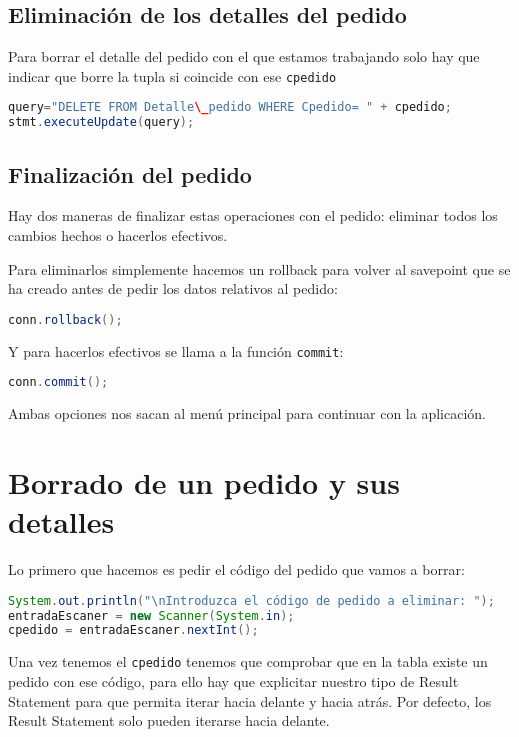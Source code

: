 \subsection{Eliminación de los detalles del pedido}

Para borrar el detalle del pedido con el que estamos trabajando solo hay que indicar que borre la tupla si coincide con ese \texttt{cpedido}

\begin{lstlisting}[language=Java]
query="DELETE FROM Detalle\_pedido WHERE Cpedido= " + cpedido;
stmt.executeUpdate(query);
\end{lstlisting}

\subsection{Finalización del pedido}

Hay dos maneras de finalizar estas operaciones con el pedido: eliminar todos los cambios hechos o hacerlos efectivos.

Para eliminarlos simplemente hacemos un rollback para volver al savepoint que se ha creado antes de pedir los datos relativos al pedido:
\begin{lstlisting}[language=Java]
conn.rollback();
\end{lstlisting}

Y para hacerlos efectivos se llama a la función \texttt{commit}:

\begin{lstlisting}[language=Java]
conn.commit();
\end{lstlisting}

Ambas opciones nos sacan al menú principal para continuar con la aplicación.

\section{Borrado de un pedido y sus detalles}

Lo primero que hacemos es pedir el código del pedido que vamos a borrar:

\begin{lstlisting}[language=Java]
System.out.println("\nIntroduzca el código de pedido a eliminar: ");
entradaEscaner = new Scanner(System.in);
cpedido = entradaEscaner.nextInt();
\end{lstlisting}

Una vez tenemos el \texttt{cpedido} tenemos que comprobar que en la tabla existe un pedido con ese código, para ello hay que explicitar nuestro tipo de Result Statement para que permita iterar hacia delante y hacia atrás. Por defecto, los Result Statement solo pueden iterarse hacia delante.


